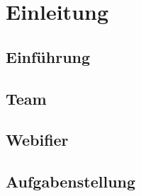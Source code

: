\chapter{Einleitung}

\section{Einführung}

\section{Team}

\section{Webifier}

\section{Aufgabenstellung}
